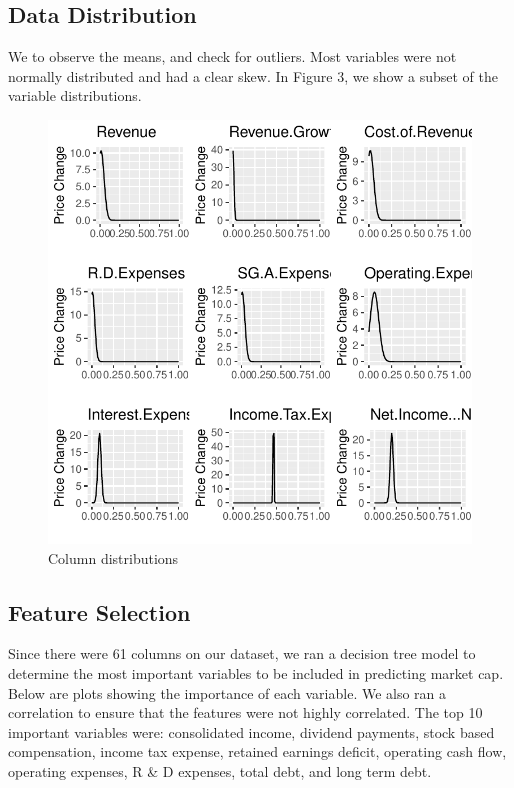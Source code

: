 \documentclass[11pt,]{article}
\begin{document}
\hypertarget{data-distribution}{%
\subsection{Data Distribution}\label{data-distribution}}

We to observe the means, and check for outliers. Most variables were not
normally distributed and had a clear skew. In Figure 3, we show a subset
of the variable distributions.

\begin{figure}

{\centering \includegraphics{stock_analysis_files/figure-latex/data normal distribution plot1-1} 

}

\caption{Column distributions}\label{fig:data normal distribution plot1}
\end{figure}

\hypertarget{feature-selection-1}{%
\subsection{Feature Selection}\label{feature-selection-1}}

Since there were 61 columns on our dataset, we ran a decision tree model
to determine the most important variables to be included in predicting
market cap. Below are plots showing the importance of each variable. We
also ran a correlation to ensure that the features were not highly
correlated. The top 10 important variables were: consolidated income,
dividend payments, stock based compensation, income tax expense,
retained earnings deficit, operating cash flow, operating expenses, R \&
D expenses, total debt, and long term debt.
\end{document}
